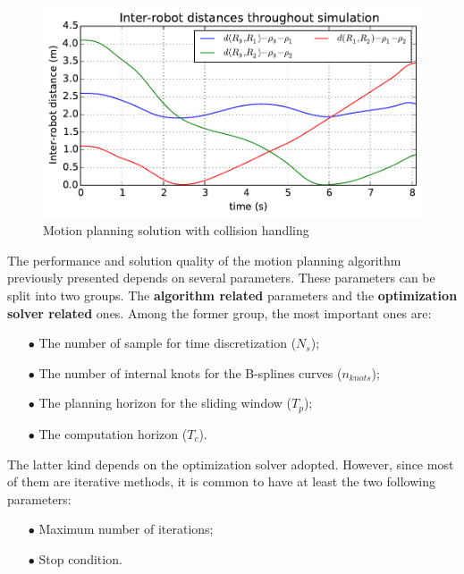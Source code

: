 \documentclass[eprint]{actapoly}
\begin{document}
\begin{figure}
  \includegraphics[width=\linewidth]{./images/no_collision/multirobot-interr.pdf} %
  \caption{Motion planning solution with collision handling\label{fig:nocollision}}
\label{fig:res}
\end{figure}

The performance and solution quality of the motion planning algorithm previously presented depends on several parameters.
These parameters can be split into two groups. The \textbf{algorithm related} parameters and the \textbf{optimization solver related} ones.
Among the former group, the most important ones are:
\begin{itemize}
\item[$\bullet$] The number of sample for time discretization ($N_s$);
\item[$\bullet$] The number of internal knots for the B-splines curves ($n_{knots}$);
\item[$\bullet$] The planning horizon for the sliding window ($T_p$);
\item[$\bullet$] The computation horizon ($T_c$).
\end{itemize}

The latter kind depends on the optimization solver adopted.
However, since most of them are iterative methods, it is common
to have at least the two following parameters:
\begin{itemize}
\item[$\bullet$] Maximum number of iterations;
\item[$\bullet$] Stop condition.
\end{itemize}

\end{document}
